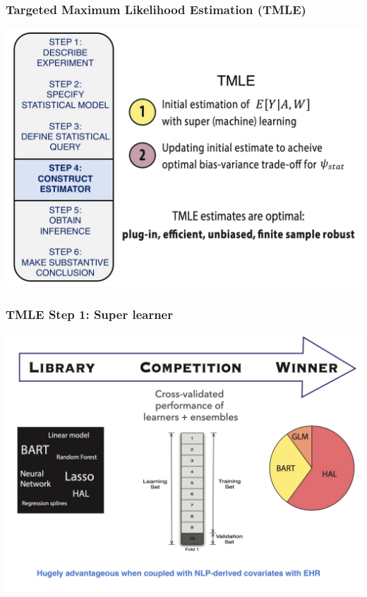 \documentclass[t]{beamer}
\begin{document}
\begin{frame}
  \frametitle{Targeted Maximum Likelihood Estimation (TMLE)}
  \vspace{-20pt}
  \begin{center}
  \includegraphics[width = 1.05\textwidth]{figures/roadmap4_1.pdf}
  \end{center}
\end{frame}
\begin{frame}
\frametitle{TMLE Step 1: Super learner}
\vspace{-15pt}
\begin{center}
\includegraphics[width = 1\textwidth]{figures/SL.pdf}
\end{center}
\end{frame}
\end{document}
